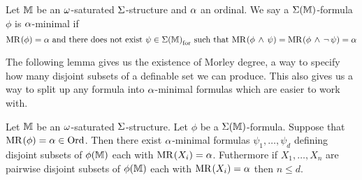 \begin{dfn}[$\al$-minimality]
    Let $\mathbb{M}$ be an $\omega$-saturated $\Sigma$-structure and $\al$ an ordinal.
    We say a $\Sigma(\mathbb{M})$-formula $\phi$ is $\al$-minimal if 
    \[\mathrm{MR}^{}(\phi) = \alpha \text{ and there does not exist } 
    \psi \in {\Sigma(\mathbb{M})}_\mathrm{for} \text{ such that } 
    \mathrm{MR}^{}(\phi \, \land \, \psi) = \mathrm{MR}^{}(\phi \, \land \, \neg\, \psi) = \alpha\]
\end{dfn}

The following lemma gives us the existence of Morley degree,
a way to specify how many disjoint subsets of a definable set we can produce.
This also gives us a way to split up any formula into $\al$-minimal formulas
which are easier to work with.
\begin{lem}
    Let $\mathbb{M}$ be an $\omega$-saturated $\Sigma$-structure.
    Let $\phi$ be a $\Sigma(\mathbb{M})$-formula.
    Suppose that $\mathrm{MR}^{}(\phi) = \alpha \in \operatorname{Ord}$.
    Then there exist $\al$-minimal formulas $\psi_1,\dots,\psi_d$ 
    defining disjoint subsets of $\phi(\mathbb{M})$
    each with $\mathrm{MR}^{}(X_i) = \alpha$.
    Futhermore if $X_1,\dots,X_n$ are 
    pairwise disjoint subsets of $\phi(\mathbb{M})$ 
    each with $\mathrm{MR}^{}(X_i) = \alpha$ then $n \le d$.
\end{lem}
